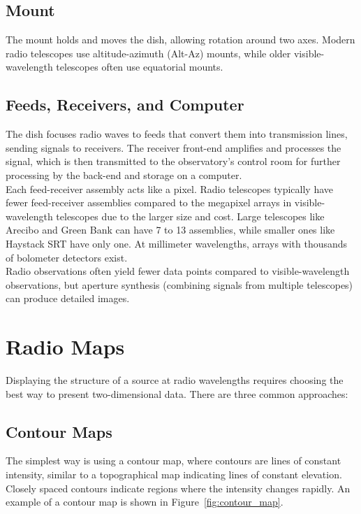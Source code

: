 \subsection{Mount}
The mount holds and moves the dish, allowing rotation around two axes. Modern radio telescopes use altitude-azimuth (Alt-Az) mounts, while older visible-wavelength telescopes often use equatorial mounts.

\subsection{Feeds, Receivers, and Computer}
The dish focuses radio waves to feeds that convert them into transmission lines, sending signals to receivers. The receiver front-end amplifies and processes the signal, which is then transmitted to the observatory's control room for further processing by the back-end and storage on a computer. \\

Each feed-receiver assembly acts like a pixel. Radio telescopes typically have fewer feed-receiver assemblies compared to the megapixel arrays in visible-wavelength telescopes due to the larger size and cost. Large telescopes like Arecibo and Green Bank can have 7 to 13 assemblies, while smaller ones like Haystack SRT have only one. At millimeter wavelengths, arrays with thousands of bolometer detectors exist. \\

Radio observations often yield fewer data points compared to visible-wavelength observations, but aperture synthesis (combining signals from multiple telescopes) can produce detailed images.

\clearpage

\section{Radio Maps}

Displaying the structure of a source at radio wavelengths requires choosing the best way to present two-dimensional data. There are three common approaches:

\subsection{Contour Maps}

The simplest way is using a contour map, where contours are lines of constant intensity, similar to a topographical map indicating lines of constant elevation. Closely spaced contours indicate regions where the intensity changes rapidly. An example of a contour map is shown in Figure~\ref{fig:contour_map}.

